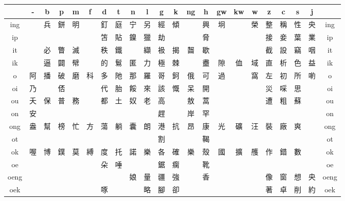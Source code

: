\documentclass{article}
\begin{document}
\begin{adjustbox}{width=\textwidth, totalheight=\baselineskip,keepaspectratio}

\begin{tabular}{|>{\columncolor{mygray}}c|c|@{\hspace{1pt}}*{19}{c|@{\hspace{1pt}}} >{\columncolor{mygray}}c|}  

	\hline
	\rowcolor{mygray} & - & b & p & m & f & d & t & n & l & g & k & ng & h & gw & kw & w & z & c & s & j &  \\
	\hline
	ing &  & 兵 & 鉼 & 明 &  & 釘 & 庭 & 宁 & 另 & 經 & 傾 &  & 興 & 坰 &  & 榮 & 整 & 稱 & 性 & 央 & ing \\
	\hline
	ip &  &  &  &  &  & 笘 & 貼 & 鎳 & 獵 & 劫 &  &  & 脅 &  &  &  & 接 & 妾 & 葉 & 業 & ip \\
	\hline
	it &  & 必 & 瞥 & 滅 &  & 秩 & 鐵 &  & 纈 & 衱 & 揭 & 齧 & 歇 &  &  &  & 截 & 設 & 竊 & 咽 & it \\
	\hline
	ik &  & 逼 & 闢 & 幦 &  & 的 & 鬄 & 匿 & 力 & 極 & 棘 &  & 衋 & 隙 & 侐 & 域 & 直 & 析 & 色 & 益 & ik \\
	\hline
	o & 阿 & 播 & 破 & 磨 & 科 & 多 & 阤 & 那 & 羅 & 哥 & 鈳 & 俄 & 可 & 過 &  & 窩 & 左 & 初 & 所 & 喲 & o \\
	\hline
	oi & 乃 &  & 俖 &  &  & 代 & 胎 & 餒 & 來 & 該 & 慨 & 呆 & 開 &  &  &  & 災 & 啋 & 思 &  & oi \\
	\hline
	ou & 夭 & 保 & 普 & 務 &  & 都 & 土 & 奴 & 老 & 高 &  & 敖 & 蒿 &  &  &  & 遭 & 粗 & 蘇 &  & ou \\
	\hline
	on & 安 &  &  &  &  &  &  &  &  & 趕 &  & 岸 & 罕 &  &  &  &  &  &  &  & on \\
	\hline
	ong & 盎 & 幫 & 榜 & 忙 & 方 & 蕩 & 躺 & 囊 & 朗 & 港 & 抗 & 昂 & 康 & 光 & 礦 & 汪 & 裝 & 廠 & 爽 &  & ong \\
	\hline
	ot &  &  &  &  &  &  &  &  &  & 割 &  &  & 鞨 &  &  &  &  &  &  &  & ot \\
	\hline
	ok & 喔 & 博 & 鏷 & 莫 & 縛 & 度 & 托 & 諾 & 樂 & 各 & 確 & 樂 & 殼 & 國 & 擴 & 雘 & 作 & 錯 & 數 &  & ok \\
	\hline
	oe &  &  &  &  &  & 朵 & 唾 &  &  & 鋸 & 瘸 &  & 靴 &  &  &  &  &  &  &  & oe \\
	\hline
	oeng &  &  &  &  &  &  &  & 娘 & 量 & 疆 & 強 &  & 香 &  &  &  & 像 & 窗 & 想 & 央 & oeng \\
	\hline
	oek &  &  &  &  &  & 啄 &  &  & 略 & 腳 & 卻 &  &  &  &  &  & 著 & 卓 & 削 & 約 & oek \\

\end{tabular}
\end{adjustbox}
\end{document}
